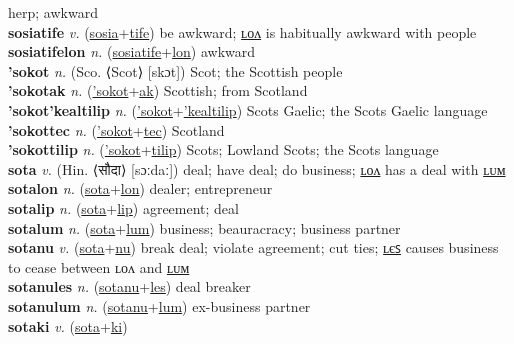 herp; awkward \label{sosiatafulum} \\
\textbf{sosiatife} \textit{v.} (\hyperref[sosia]{sosia}+\hyperref[tife]{tife})
be awkward; \hyperref[sosiatifelon]{ʟᴏᴧ} is habitually awkward with people \label{sosiatife} \\
\textbf{sosiatifelon} \textit{n.} (\hyperref[sosiatife]{sosiatife}+\hyperref[lon]{lon})
awkward \label{sosiatifelon} \\
\textbf{'sokot} \textit{n.} (Sco. ⟨Scot⟩ [skɔt])
Scot; the Scottish people \label{'sokot} \\
\textbf{'sokotak} \textit{n.} (\hyperref['sokot]{'sokot}+\hyperref[ak]{ak})
Scottish; from Scotland \label{'sokotak} \\
\textbf{'sokot'kealtilip} \textit{n.} (\hyperref['sokot]{'sokot}+\hyperref['kealtilip]{'kealtilip})
Scots Gaelic; the Scots Gaelic language \label{'sokot'kealtilip} \\
\textbf{'sokottec} \textit{n.} (\hyperref['sokot]{'sokot}+\hyperref[tec]{tec})
Scotland \label{'sokottec} \\
\textbf{'sokottilip} \textit{n.} (\hyperref['sokot]{'sokot}+\hyperref[tilip]{tilip})
Scots; Lowland Scots; the Scots language \label{'sokottilip} \\
\textbf{sota} \textit{v.} (Hin. ⟨सौदा⟩ [sɔːdaː])
deal; have deal; do business; \hyperref[sotalon]{ʟᴏᴧ} has a deal with \hyperref[sotalum]{ʟᴜᴍ} \label{sota} \\
\textbf{sotalon} \textit{n.} (\hyperref[sota]{sota}+\hyperref[lon]{lon})
dealer; entrepreneur \label{sotalon} \\
\textbf{sotalip} \textit{n.} (\hyperref[sota]{sota}+\hyperref[lip]{lip})
agreement; deal \label{sotalip} \\
\textbf{sotalum} \textit{n.} (\hyperref[sota]{sota}+\hyperref[lum]{lum})
business; beauracracy; business partner \label{sotalum} \\
\textbf{sotanu} \textit{v.} (\hyperref[sota]{sota}+\hyperref[nu]{nu})
break deal; violate agreement; cut ties; \hyperref[sotanules]{ʟєꜱ} causes business to cease between ʟᴏᴧ and \hyperref[sotanulum]{ʟᴜᴍ} \label{sotanu} \\
\textbf{sotanules} \textit{n.} (\hyperref[sotanu]{sotanu}+\hyperref[les]{les})
deal breaker \label{sotanules} \\
\textbf{sotanulum} \textit{n.} (\hyperref[sotanu]{sotanu}+\hyperref[lum]{lum})
ex-business partner \label{sotanulum} \\
\textbf{sotaki} \textit{v.} (\hyperref[sota]{sota}+\hyperref[ki]{ki})
